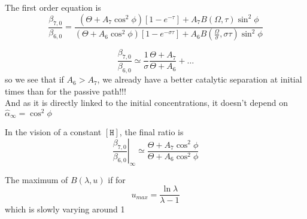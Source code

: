\documentclass[aps,onecolumn,12pt]{revtex4}
\newcommand{\mychem}[1]{\mathtt{#1}}
\newcommand{\myconc}[1]{\left\lbrack{#1}\right\rbrack}
\newcommand{\spproton}{\mychem{H}}
\newcommand{\proton}{\myconc{\spproton}}
\begin{document}
The first order equation is
\begin{equation}
	\dfrac{\beta_{7,0}}{\beta_{6,0}} = 
	\dfrac
	{\left( \Theta + A_7\cos^2\phi \right)  \left[1-e^{-\tau}\right]+ A_7B(\Omega,\tau) \sin^2\phi }
	{\left( \Theta + A_6\cos^2\phi \right)  \left[1-e^{-\sigma\tau}\right]+ A_6B(\frac{\Omega}{\sigma},\sigma\tau) \sin^2\phi }
\end{equation}

\begin{equation}
\dfrac{\beta_{7,0}}{\beta_{6,0}} \simeq \dfrac{1}{\sigma}\dfrac{\Theta+A_7}{\Theta+A_6} + \ldots
\end{equation}
so we see that if $A_6>A_7$, we already have a better catalytic separation at initial times than for the passive path!!!\\
And as it is directly linked to the initial concentrations, it doesn't depend on $\hat\alpha_\infty=\cos^2\phi$

In the vision of a constant $\proton$, the final ratio is
\begin{equation}
	\left.\dfrac{\beta_{7,0}}{\beta_{6,0}}\right|_\infty \simeq \dfrac{\Theta+A_7\cos^2\phi}{\Theta+A_6\cos^2\phi}
\end{equation}


The maximum of $B(\lambda,u)$ if for
$$
	u_{max} = \dfrac{\ln \lambda}{\lambda-1}
$$
which is slowly varying around 1
\end{document}
